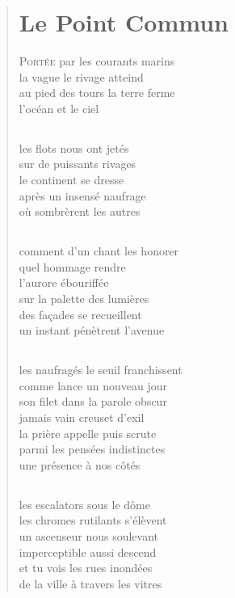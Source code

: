 \documentclass[a4paper,12pt,openright]{memoir}
\begin{document}
\begin{verse}
\settowidth{\versewidth}{jamais vain creuset d'exil}
\vspace{1cm}
\chapter*{Le Point Commun}
\vspace{1cm}
{\lettrine[lines=1]{\textcolor[gray]{0.6}{P}}{ortée} par les courants marins}\\
la vague le rivage atteind\\
au pied des tours la terre ferme\\
l'océan et le ciel
 
\section*{}
les flots nous ont jetés\\
sur de puissants rivages\\
le continent se dresse\\
après un insensé naufrage\\
où sombrèrent les autres

\section*{}
comment d'un chant les honorer\\
quel hommage rendre\\
l'aurore ébouriffée\\
sur la palette des lumières\\
des façades se recueillent\\
un instant pénètrent l'avenue

\section*{}
les naufragés le seuil franchissent\\
comme lance un nouveau jour\\
son filet dans la parole obscur\\
jamais vain creuset d'exil\\
la prière appelle puis scrute\\
parmi les pensées indistinctes\\
une présence à nos côtés

\section*{}
les escalators sous le dôme\\
les chromes rutilants s'élèvent\\
un ascenseur nous soulevant\\
imperceptible aussi descend\\
et tu vois les rues inondées\\
de la ville à travers les vitres
\end{verse}
\end{document}
